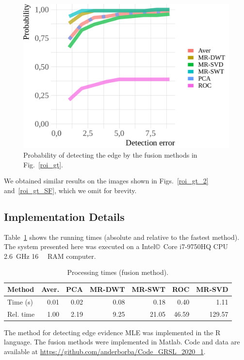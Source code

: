 \documentclass[journal]{IEEEtran}
\begin{document}
\begin{figure}[hbt]
	\centering
	\includegraphics[width=.7\linewidth]{metricas_6_fusao_flevoland}
	\caption{Probability of detecting the edge by the fusion methods in Fig.~\ref{roi_gt}.}
	\label{probability_edge_detc}
\end{figure}

We obtained similar results on the images shown in Figs.~\ref{roi_gt_2} and~\ref{roi_gt_SF}, which we omit for brevity.

\subsection{Implementation Details}

Table~\ref{metrica_de_tempo} shows the running times (absolute and relative to the fastest method).
The system presented here was executed on a Intel\copyright\ Core i7-9750HQ CPU \SI{2.6}{\giga\hertz} \SI{16}{\giga\byte} RAM computer. 

\begin{table}[hbt]
	\centering
	\caption{Processing times (fusion method).}\label{metrica_de_tempo}
	\begin{tabular}{@{}lrrrrrr@{}} \toprule
		Method       & Aver.   &   PCA      &  MR-DWT  & MR-SWT &  ROC  &  MR-SVD \\ \midrule
		Time (s)      & 0.01      & 0.02       &  0.08 & 0.18      &  0.40       & 1.11  \\
		Rel. time     & 1.00      & 2.19       &  9.25 & 21.05     &  46.59      & 129.57  \\ \bottomrule
	\end{tabular}
\end{table}

The method for detecting edge evidence MLE was implemented in the R language.
The fusion methods were implemented in Matlab. 
Code and data are available at \url{https://github.com/anderborba/Code_GRSL_2020_1}.
\end{document}
